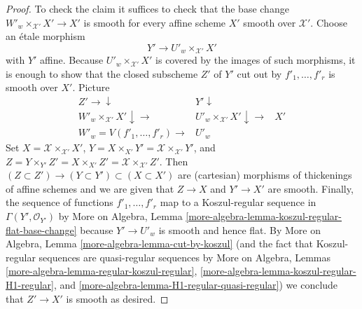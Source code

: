 \begin{proof}
\medskip\noindent
To check the claim it suffices to check that the base change
$W'_w \times_{\mathcal{X}'} X' \to X'$ is smooth for every
affine scheme $X'$ smooth over $\mathcal{X}'$. Choose an
\'etale morphism
$$
Y' \to U'_w \times_{\mathcal{X}'} X'
$$
with $Y'$ affine. Because $U'_w \times_{\mathcal{X}'} X'$ is covered
by the images of such morphisms, it is enough to show that the closed
subscheme $Z'$ of $Y'$ cut out by $f'_1, \ldots, f'_r$ is smooth over $X'$.
Picture
$$
\begin{array}{ccc}Z' \longrightarrow\downarrow & Y' \downarrow &  \\ W'_w \times_{\mathcal{X}'} X' \downarrow\longrightarrow & U'_w \times_{\mathcal{X}'} X' \downarrow\longrightarrow & X' \\ W'_w = V(f'_1, \ldots, f'_r) \longrightarrow & U'_w & \end{array}
$$
Set $X = \mathcal{X} \times_{\mathcal{X}'} X'$,
$Y = X \times_{X'} Y' = \mathcal{X} \times_{\mathcal{X}'} Y'$, and
$Z = Y \times_{Y'} Z' = X \times_{X'} Z' =
\mathcal{X} \times_{\mathcal{X}'} Z'$.
Then $(Z \subset Z') \to (Y \subset Y') \subset (X \subset X')$
are (cartesian) morphisms of thickenings of affine schemes and
we are given that $Z \to X$ and $Y' \to X'$ are smooth.
Finally, the sequence of functions $f'_1, \ldots, f'_r$
map to a Koszul-regular sequence in $\Gamma(Y', \mathcal{O}_{Y'})$ by
More on Algebra, Lemma \ref{more-algebra-lemma-koszul-regular-flat-base-change}
because $Y' \to U'_w$ is smooth and hence flat.
By More on Algebra, Lemma \ref{more-algebra-lemma-cut-by-koszul}
(and the fact that Koszul-regular sequences are quasi-regular sequences
by More on Algebra, Lemmas \ref{more-algebra-lemma-regular-koszul-regular},
\ref{more-algebra-lemma-koszul-regular-H1-regular}, and
\ref{more-algebra-lemma-H1-regular-quasi-regular})
we conclude that $Z' \to X'$ is smooth as desired.
\end{proof}

